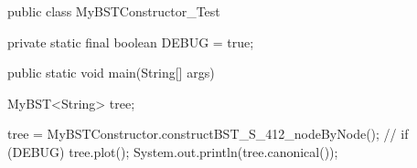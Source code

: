 public class MyBSTConstructor_Test {

	private static final boolean DEBUG = true;

	public static void main(String[] args) {
		MyBST<String> tree;
		
		tree = MyBSTConstructor.constructBST_S_412_nodeByNode();
		//
		if (DEBUG) {
			tree.plot();
			System.out.println(tree.canonical());
		}
	}

}

